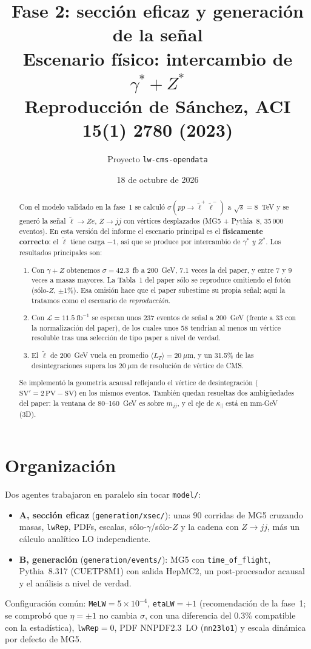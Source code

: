\documentclass[11pt,a4paper]{article}
\title{\textbf{Fase 2: sección eficaz y generación de la señal}\\[2pt]\Large Escenario físico: intercambio de $\gamma^*+Z^*$\\[3pt]
\large Reproducción de Sánchez, ACI \textbf{15}(1) 2780 (2023)}
\author{Proyecto \texttt{lw-cms-opendata}}
\date{18 de octubre de 2026}
\newcommand{\lt}{\tilde{\ell}}
\newcommand{\kpar}{\kappa_{\parallel}}
\begin{document}
\sloppy
\maketitle

\begin{abstract}
\noindent Con el modelo validado en la fase~1 se calculó $\sigma(pp\to\lt^+\lt^-)$ a $\sqrt s=8$~TeV y se generó la señal $\lt\to Ze$, $Z\to jj$ con vértices desplazados (MG5 + Pythia~8, 35\,000 eventos). En esta versión del informe el escenario principal es el \textbf{físicamente correcto}: el $\lt$ tiene carga $-1$, así que se produce por intercambio de $\gamma^*$ \emph{y} $Z^*$. Los resultados principales son:
\begin{enumerate}
\item Con $\gamma+Z$ obtenemos $\sigma=42.3$~fb a 200~GeV, 7.1 veces la del paper, y entre 7 y 9 veces a masas mayores. La Tabla~1 del paper sólo se reproduce omitiendo el fotón (sólo-$Z$, $\pm1\%$). Esa omisión hace que el paper subestime su propia señal; aquí la tratamos como el escenario de \emph{reproducción}.
\item Con $\mathcal{L}=11.5~\mathrm{fb}^{-1}$ se esperan unos 237 eventos de señal a 200~GeV (frente a 33 con la normalización del paper), de los cuales unos 58 tendrían al menos un vértice resoluble tras una selección de tipo paper a nivel de verdad.
\item El $\lt$ de 200~GeV vuela en promedio $\langle L_T\rangle=20~\mu$m, y un 31.5\% de las desintegraciones supera los $20~\mu$m de resolución de vértice de CMS.
\end{enumerate}
Se implementó la geometría acausal reflejando el vértice de desintegración ($\mathrm{SV}'=2\,\mathrm{PV}-\mathrm{SV}$) en los mismos eventos. También quedan resueltas dos ambigüedades del paper: la ventana de 80--160~GeV es sobre $m_{jj}$, y el eje de $\kpar$ está en mm$\cdot$GeV (3D).
\end{abstract}

\section{Organización}
Dos agentes trabajaron en paralelo sin tocar \texttt{model/}:
\begin{itemize}
\item \textbf{A, sección eficaz} (\texttt{generation/xsec/}): unas 90 corridas de MG5 cruzando masas, \texttt{lwRep}, PDFs, escalas, sólo-$\gamma$/sólo-$Z$ y la cadena con $Z\to jj$, más un cálculo analítico LO independiente.
\item \textbf{B, generación} (\texttt{generation/events/}): MG5 con \texttt{time\_of\_flight}, Pythia~8.317 (CUETP8M1) con salida HepMC2, un post-procesador acausal y el análisis a nivel de verdad.
\end{itemize}
Configuración común: \texttt{MeLW}$=5\times10^{-4}$, \texttt{etaLW}$=+1$ (recomendación de la fase~1; se comprobó que $\eta=\pm1$ no cambia $\sigma$, con una diferencia del 0.3\% compatible con la estadística), \texttt{lwRep}$=0$, PDF NNPDF2.3~LO (\texttt{nn23lo1}) y escala dinámica por defecto de MG5.
\end{document}
